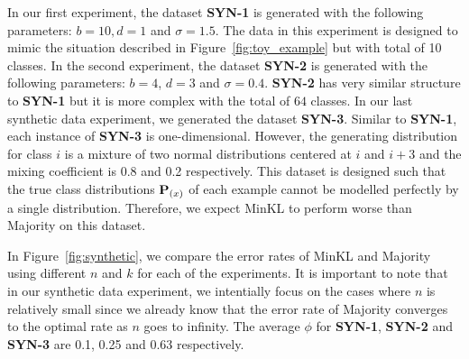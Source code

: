 \documentclass{article}
\begin{document}
In our first experiment, the dataset \textbf{SYN-1} is generated with
the following parameters: $b=10, d=1$ and $\sigma=1.5$. The data in
this experiment is designed to mimic the situation described in
Figure~\ref{fig:toy_example} but with total of 10 classes. In the
second experiment, the dataset \textbf{SYN-2} is generated with the
following parameters: $b=4$, $d=3$ and $\sigma=0.4$. \textbf{SYN-2}
has very similar structure to \textbf{SYN-1} but it is more complex
with the total of $64$ classes. In our last synthetic data experiment,
we generated the dataset \textbf{SYN-3}. Similar to \textbf{SYN-1},
each instance of \textbf{SYN-3} is one-dimensional. However, the
generating distribution for class $i$ is a mixture of two normal
distributions centered at $i$ and $i+3$ and the mixing coefficient is
0.8 and 0.2 respectively. This dataset is designed such that the true
class distributions $\mathbf{P}_{(x)}$ of each example cannot be modelled
perfectly by a single distribution. Therefore, we expect MinKL to
perform worse than Majority on this dataset.

In Figure~\ref{fig:synthetic}, we compare the error rates of MinKL and
Majority using different $n$ and $k$ for each of the experiments. It
is important to note that in our synthetic data experiment, we
intentially focus on the cases where $n$ is relatively small since we
already know that the error rate of Majority converges to the optimal
rate as $n$ goes to infinity. The average $\phi$ for \textbf{SYN-1},
\textbf{SYN-2} and \textbf{SYN-3} are 0.1, 0.25 and 0.63 respectively.
 
\end{document}

